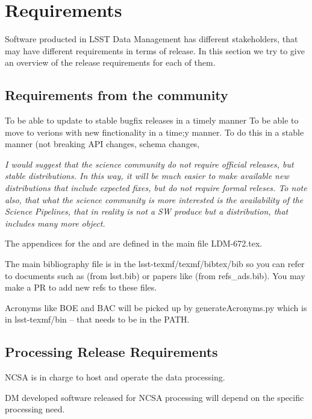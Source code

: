 \section{Requirements} \label{sec:reqs}

Software producted in LSST Data Management has different stakeholders, that may have different requirements in terms of release.
In this section we try to give an overview of the release requirements for each of them.


\subsection{Requirements from the community } \label{sec:comreqs}

To be able to update to stable bugfix releases in a timely manner
To be able to move to verions with new finctionality in a time;y manner.
To do this in a stable manner (not breaking API changes, schema changes,

\textit{ I would suggest that the science community do not require official releases, but stable distributions.
In this way, it will be much easier to make available new distributions that include expected fixes, 
but do not require formal releses.
To note also, that what the science community is more interested is the availability of the Science Pipelines,
that in reality is not a SW produce but a distribution, that includes many more object.  }

The appendices for the  and  are defined in the main file LDM-672.tex.

The main bibliography file is in the lsst-texmf/texmf/bibtex/bib so you can refer 
to documents such as  (from lsst.bib)  or papers like \cite{2008arXiv0805.2366I} (from refs\_ads.bib). You may make a PR to add new refs to these files.

Acronyms like BOE and BAC will be picked up by generateAcronyms.py which is in lsst-texmf/bin -- that needs to be in the PATH.


\subsection{Processing Release Requirements} \label{sec:procreqs}

NCSA is in charge to host and operate the data processing.

DM developed software released for NCSA processing will depend on the specific processing need.

